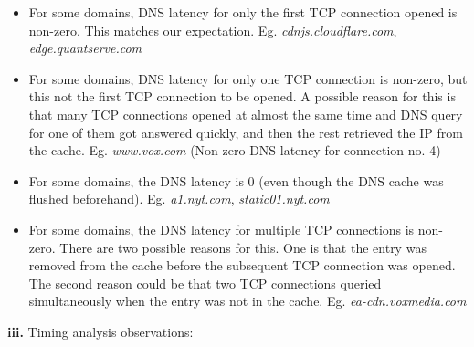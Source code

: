\documentclass[12pt]{article}
\begin{document}
\begin{itemize}
\item For some domains, DNS latency for only the first TCP connection opened is non-zero. This matches our expectation. Eg. \emph{cdnjs.cloudflare.com}, \emph{edge.quantserve.com}
\item For some domains, DNS latency for only one TCP connection is non-zero, but this not the first TCP connection to be opened. A possible reason for this is that many TCP connections opened at almost the same time and DNS query for one of them got answered quickly, and then the rest retrieved the IP from the cache. Eg. \emph{www.vox.com} (Non-zero DNS latency for connection no. 4)
\item For some domains, the DNS latency is 0 (even though the DNS cache was flushed beforehand). Eg. \emph{a1.nyt.com}, \emph{static01.nyt.com} %
\item For some domains, the DNS latency for multiple TCP connections is non-zero. There are two possible reasons for this. One is that the entry was removed from the cache before the subsequent TCP connection was opened. The second reason could be that two TCP connections queried simultaneously when the entry was not in the cache. Eg. \emph{ea-cdn.voxmedia.com}
\end{itemize}
\textbf{iii.} Timing analysis observations:
\end{document}
